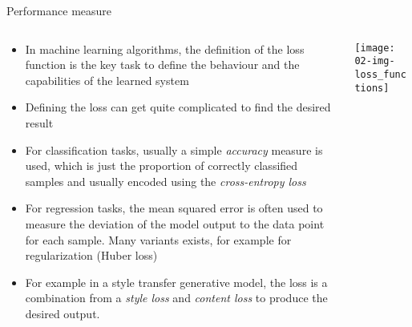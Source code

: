   \begin{frame}{Performance measure}
    \begin{columns}
      \begin{column}{0.65\textwidth}
        \begin{itemize}
          \item In machine learning algorithms, the definition of the loss function is the key task to define the behaviour and the capabilities of the learned system
          \item Defining the loss can get quite complicated to find the desired result
          \item For classification tasks, usually a simple \emph{accuracy} measure is used, which is just the proportion of correctly classified samples and usually encoded using the \emph{cross-entropy loss}
          \item For regression tasks, the mean squared error is often used to measure the deviation of the model output to the data point for each sample.
            Many variants exists, for example for regularization (Huber loss)
          \item For example in a style transfer generative model, the loss is a combination from a \emph{style loss} and \emph{content loss} to produce the desired output.
        \end{itemize}
      \end{column}
      \begin{column}{0.35\textwidth}
        \vspace*{1em}
        \texttt{[image: 02-img-loss\_functions]}
      \end{column}
    \end{columns}
  \end{frame}

